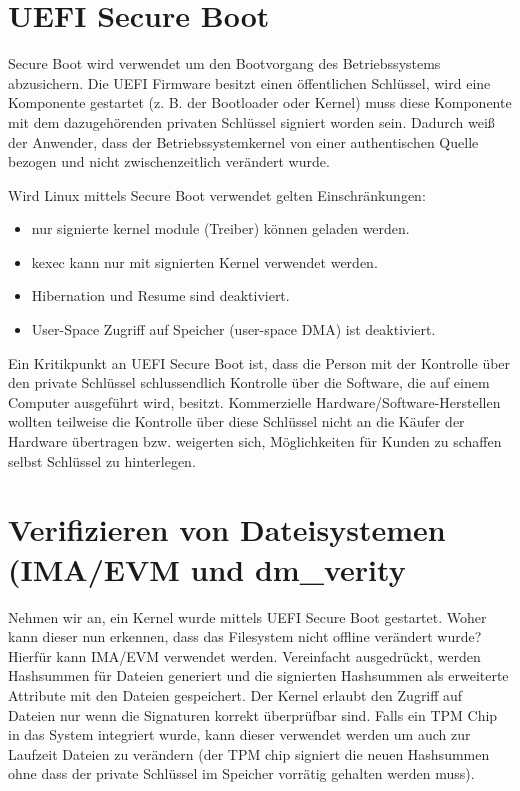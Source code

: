 \section{UEFI Secure Boot}

Secure Boot wird verwendet um den Bootvorgang des Betriebssystems abzusichern. Die UEFI Firmware besitzt einen öffentlichen Schlüssel, wird eine Komponente gestartet (z. B. der Bootloader oder Kernel) muss diese Komponente mit dem dazugehörenden privaten Schlüssel signiert worden sein. Dadurch weiß der Anwender, dass der Betriebssystemkernel von einer authentischen Quelle bezogen und nicht zwischenzeitlich verändert wurde.

Wird Linux mittels Secure Boot verwendet gelten Einschränkungen:

\begin{itemize}
	\item nur signierte kernel module (Treiber) können geladen werden.
	\item kexec kann nur mit signierten Kernel verwendet werden.
	\item Hibernation und Resume sind deaktiviert.
	\item User-Space Zugriff auf Speicher (user-space DMA) ist deaktiviert.
\end{itemize}

Ein Kritikpunkt an UEFI Secure Boot ist, dass die Person mit der Kontrolle über den private Schlüssel schlussendlich Kontrolle über die Software, die auf einem Computer ausgeführt wird, besitzt. Kommerzielle Hardware/Software-Herstellen wollten teilweise die Kontrolle über diese Schlüssel nicht an die Käufer der Hardware übertragen bzw. weigerten sich, Möglichkeiten für Kunden zu schaffen selbst Schlüssel zu hinterlegen.

\section{Verifizieren von Dateisystemen (IMA/EVM und dm\_verity}

Nehmen wir an, ein Kernel wurde mittels UEFI Secure Boot gestartet. Woher kann dieser nun erkennen, dass das Filesystem nicht offline verändert wurde? Hierfür kann IMA/EVM verwendet werden. Vereinfacht ausgedrückt, werden Hashsummen für Dateien generiert und die signierten Hashsummen als erweiterte Attribute mit den Dateien gespeichert. Der Kernel erlaubt den Zugriff auf Dateien nur wenn die Signaturen korrekt überprüfbar sind. Falls ein TPM Chip in das System integriert wurde, kann dieser verwendet werden um auch zur Laufzeit Dateien zu verändern (der TPM chip signiert die neuen Hashsummen ohne dass der private Schlüssel im Speicher vorrätig gehalten werden muss).

